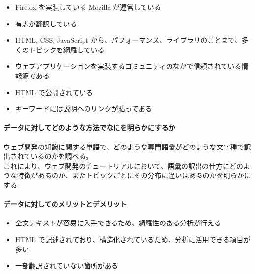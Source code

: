 \begin{itemize}
\tightlist
\item
  Firefox を実装している Mozilla が運営している
\item
  有志が翻訳している
\item
  HTML, CSS, JavaScript
  から、パフォーマンス、ライブラリのことまで、多くのトピックを網羅している
\item
  ウェブアプリケーションを実装するコミュニティのなかで信頼されている情報源である
\item
  HTML で公開されている
\item
  キーワードには説明へのリンクが貼ってある
\end{itemize}

\hypertarget{ux30c7ux30fcux30bfux306bux5bfeux3057ux3066ux3069ux306eux3088ux3046ux306aux65b9ux6cd5ux3067ux306aux306bux3092ux660eux3089ux304bux306bux3059ux308bux304b-3}{%
\paragraph{データに対してどのような方法でなにを明らかにするか}\label{ux30c7ux30fcux30bfux306bux5bfeux3057ux3066ux3069ux306eux3088ux3046ux306aux65b9ux6cd5ux3067ux306aux306bux3092ux660eux3089ux304bux306bux3059ux308bux304b-3}}

ウェブ開発の知識に関する単語で、どのような専門語彙がどのような文字種で訳出されているのかを調べる。\\
これにより、ウェブ開発のチュートリアルにおいて、語彙の訳出の仕方にどのような特徴があるのか、またトピックごとにその分布に違いはあるのかを明らかにする

\hypertarget{ux30c7ux30fcux30bfux306bux5bfeux3057ux3066ux306eux30e1ux30eaux30c3ux30c8ux3068ux30c7ux30e1ux30eaux30c3ux30c8-3}{%
\paragraph{データに対してのメリットとデメリット}\label{ux30c7ux30fcux30bfux306bux5bfeux3057ux3066ux306eux30e1ux30eaux30c3ux30c8ux3068ux30c7ux30e1ux30eaux30c3ux30c8-3}}

\begin{itemize}
\tightlist
\item
  全文テキストが容易に入手できるため、網羅性のある分析が行える
\item
  HTML
  で記述されており、構造化されているため、分析に活用できる項目が多い
\item
  一部翻訳されていない箇所がある
\end{itemize}

